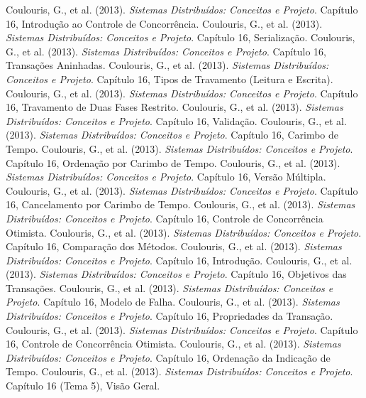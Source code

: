 \documentclass[12pt, a4paper]{article}
\begin{document}
\begin{thebibliography}{99}
 Coulouris, G., et al. (2013). \textit{Sistemas Distribuídos: Conceitos e Projeto}. Capítulo 16, Introdução ao Controle de Concorrência.
 Coulouris, G., et al. (2013). \textit{Sistemas Distribuídos: Conceitos e Projeto}. Capítulo 16, Serialização.
 Coulouris, G., et al. (2013). \textit{Sistemas Distribuídos: Conceitos e Projeto}. Capítulo 16, Transações Aninhadas.
 Coulouris, G., et al. (2013). \textit{Sistemas Distribuídos: Conceitos e Projeto}. Capítulo 16, Tipos de Travamento (Leitura e Escrita).
 Coulouris, G., et al. (2013). \textit{Sistemas Distribuídos: Conceitos e Projeto}. Capítulo 16, Travamento de Duas Fases Restrito.
 Coulouris, G., et al. (2013). \textit{Sistemas Distribuídos: Conceitos e Projeto}. Capítulo 16, Validação.
 Coulouris, G., et al. (2013). \textit{Sistemas Distribuídos: Conceitos e Projeto}. Capítulo 16, Carimbo de Tempo.
 Coulouris, G., et al. (2013). \textit{Sistemas Distribuídos: Conceitos e Projeto}. Capítulo 16, Ordenação por Carimbo de Tempo.
 Coulouris, G., et al. (2013). \textit{Sistemas Distribuídos: Conceitos e Projeto}. Capítulo 16, Versão Múltipla.
 Coulouris, G., et al. (2013). \textit{Sistemas Distribuídos: Conceitos e Projeto}. Capítulo 16, Cancelamento por Carimbo de Tempo.
 Coulouris, G., et al. (2013). \textit{Sistemas Distribuídos: Conceitos e Projeto}. Capítulo 16, Controle de Concorrência Otimista.
 Coulouris, G., et al. (2013). \textit{Sistemas Distribuídos: Conceitos e Projeto}. Capítulo 16, Comparação dos Métodos.
 Coulouris, G., et al. (2013). \textit{Sistemas Distribuídos: Conceitos e Projeto}. Capítulo 16, Introdução.
 Coulouris, G., et al. (2013). \textit{Sistemas Distribuídos: Conceitos e Projeto}. Capítulo 16, Objetivos das Transações.
 Coulouris, G., et al. (2013). \textit{Sistemas Distribuídos: Conceitos e Projeto}. Capítulo 16, Modelo de Falha.
 Coulouris, G., et al. (2013). \textit{Sistemas Distribuídos: Conceitos e Projeto}. Capítulo 16, Propriedades da Transação.
 Coulouris, G., et al. (2013). \textit{Sistemas Distribuídos: Conceitos e Projeto}. Capítulo 16, Controle de Concorrência Otimista.
 Coulouris, G., et al. (2013). \textit{Sistemas Distribuídos: Conceitos e Projeto}. Capítulo 16, Ordenação da Indicação de Tempo.
 Coulouris, G., et al. (2013). \textit{Sistemas Distribuídos: Conceitos e Projeto}. Capítulo 16 (Tema 5), Visão Geral.

\end{thebibliography}
\end{document}
